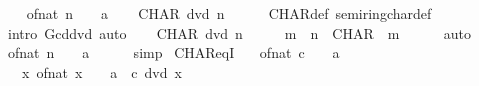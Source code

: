 \begin{isabellebody}
%
\isadelimproof
%
\endisadelimproof
%
\isatagproof
{}\isamarkupfalse%
\isanewline
\ \ \isamarkupfalse%
\ {\isachardoublequoteopen}of{\isacharunderscore}{\kern0pt}nat\ n\ {\isacharequal}{\kern0pt}\ {\isacharparenleft}{\kern0pt}{}\ {\isacharcolon}{\kern0pt}{\isacharcolon}{\kern0pt}\ {\isacharprime}{\kern0pt}a{\isacharparenright}{\kern0pt}{\isachardoublequoteclose}\isanewline
\ \ \isamarkupfalse%
\ {\isachardoublequoteopen}CHAR\ dvd\ n{\isachardoublequoteclose}\isanewline
\ \ \ \ \isamarkupfalse%
\ CHAR{\isacharunderscore}{\kern0pt}def\ semiring{\isacharunderscore}{\kern0pt}char{\isacharunderscore}{\kern0pt}def\ \isamarkupfalse%
\ {\isacharparenleft}{\kern0pt}intro\ Gcd{\isacharunderscore}{\kern0pt}dvd{\isacharparenright}{\kern0pt}\ auto\isanewline
{}\isamarkupfalse%
\isanewline
\ \ \isamarkupfalse%
\ {\isachardoublequoteopen}CHAR\ dvd\ n{\isachardoublequoteclose}\isanewline
\ \ \isamarkupfalse%
\ \isamarkupfalse%
\ m\ \ {\isachardoublequoteopen}n\ {\isacharequal}{\kern0pt}\ CHAR\ {\isacharasterisk}{\kern0pt}\ m{\isachardoublequoteclose}\isanewline
\ \ \ \ \isamarkupfalse%
\ auto\isanewline
\ \ \isamarkupfalse%
\ {\isachardoublequoteopen}of{\isacharunderscore}{\kern0pt}nat\ n\ {\isacharequal}{\kern0pt}\ {\isacharparenleft}{\kern0pt}{}\ {\isacharcolon}{\kern0pt}{\isacharcolon}{\kern0pt}\ {\isacharprime}{\kern0pt}a{\isacharparenright}{\kern0pt}{\isachardoublequoteclose}\isanewline
\ \ \ \ \isamarkupfalse%
\ simp\isanewline
{}\isamarkupfalse%
%
\endisatagproof
{\isafoldproof}%
%
\isadelimproof
\isanewline
%
\endisadelimproof
\isanewline
{}\isamarkupfalse%
\ CHAR{\isacharunderscore}{\kern0pt}eqI{\isacharcolon}{\kern0pt}\isanewline
\ \ \ {\isachardoublequoteopen}of{\isacharunderscore}{\kern0pt}nat\ c\ {\isacharequal}{\kern0pt}\ {\isacharparenleft}{\kern0pt}{}\ {\isacharcolon}{\kern0pt}{\isacharcolon}{\kern0pt}\ {\isacharprime}{\kern0pt}a{\isacharparenright}{\kern0pt}{\isachardoublequoteclose}\isanewline
\ \ \ {\isachardoublequoteopen}{\isasymAnd}x{\isachardot}{\kern0pt}\ of{\isacharunderscore}{\kern0pt}nat\ x\ {\isacharequal}{\kern0pt}\ {\isacharparenleft}{\kern0pt}{}\ {\isacharcolon}{\kern0pt}{\isacharcolon}{\kern0pt}\ {\isacharprime}{\kern0pt}a{\isacharparenright}{\kern0pt}\ {\isasymLongrightarrow}\ c\ dvd\ x{\isachardoublequoteclose}\isanewline

\end{isabellebody}
